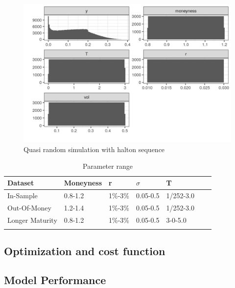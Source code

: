 \begin{figure}[H]
\centering
\includegraphics{Figures/marginalAmerPut.png}
\decoRule
\caption[Marginal distributions for american put]{Quasi random simulation with halton sequence}
\label{fig:marginalAmerPut}
\end{figure}

\begin{table}[H]
\caption{Parameter range}
\label{tab:totalEuroParRange}
\centering
\begin{tabular}{l l l l l l l }
\toprule
\textbf{Dataset} & \textbf{Moneyness} & \textbf{r} & \textbf{$\sigma$} & \textbf{T} \\
\midrule
In-Sample & 0.8-1.2 & 1\%-3\% & 0.05-0.5 & 1/252-3.0\\ 
Out-Of-Money & 1.2-1.4 & 1\%-3\% & 0.05-0.5 & 1/252-3.0\\ 
Longer Maturity & 0.8-1.2 & 1\%-3\% & 0.05-0.5 & 3-0-5.0\\ 
\bottomrule\\
\end{tabular}
\end{table}

\subsection{Optimization and cost function}

\subsection{Model Performance}

